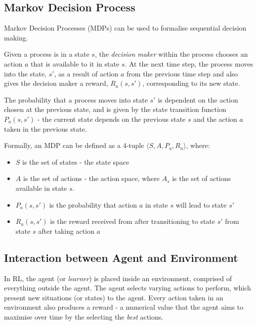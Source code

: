 \documentclass{article}
\begin{document}
\subsection{Markov Decision Process}

Markov Decision Processes (MDPs) can be used to formalise sequential decision making. 

Given a process is in a state $s$, the \textit{decision maker} within the process chooses an action $a$ that is available to it in state $s$. At the next time step, the process moves into the state, $s'$, as a result of action $a$ from the previous time step and also gives the decision maker a reward, $R_{a}(s, s')$, corresponding to its new state.

The probability that a process moves into state $s'$ is dependent on the action chosen at the previous state, and is given by the state transition function $P_{a}(s, s')$ - the current state depends on the previous state $s$ and the action $a$ taken in the previous state. 

Formally, an MDP can be defined as a 4-tuple $\langle S, A, P_a, R_a \rangle $, where: 

\begin{itemize}
    \item $S$ is the set of states - the state space
    
    \item $A$ is the set of actions - the action space, where $A_s$ is the set of actions available in state $s$.
    
    \item $P_{a}(s, s')$ is the probability that action $a$ in state $s$ will lead to state $s'$
    
    \item $R_{a}(s, s')$ is the reward received from after transitioning to state $s'$ from state $s$ after taking action $a$
\end{itemize}


\subsection{Interaction between Agent and Environment}

In RL, the agent (or \textit{learner}) is placed inside an environment, comprised of everything outside the agent. The agent selects varying actions to perform, which present new situations (or states) to the agent. Every action taken in an environment also produces a reward - a numerical value that the agent aims to maximise over time by the selecting the \textit{best} actions\cite{Sutton1998}. 
\end{document}
